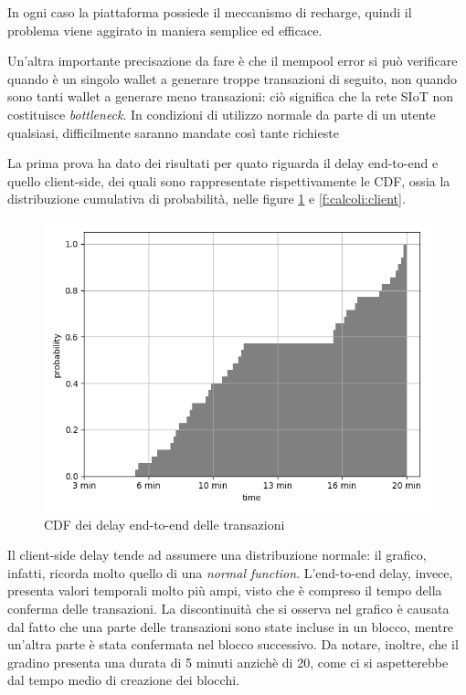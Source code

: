 In ogni caso la piattaforma possiede il meccanismo di recharge, quindi il problema viene aggirato in maniera semplice ed efficace.

Un'altra importante precisazione da fare è che il mempool error si può verificare quando è un singolo wallet a generare troppe transazioni di seguito, non quando sono tanti wallet a generare meno transazioni: ciò significa che la rete SIoT non costituisce \textit{bottleneck}. In condizioni di utilizzo normale da parte di un utente qualsiasi, difficilmente saranno mandate così tante richieste

La prima prova ha dato dei risultati per quato riguarda il delay end-to-end e quello client-side, dei quali sono rappresentate rispettivamente le CDF, ossia la distribuzione cumulativa di probabilità, nelle figure \ref{f:calcoli:end2end} e \ref{f:calcoli:client}. 

\begin{figure}[h!t]
\centerline{\includegraphics[width=\textwidth]{img/end-to-endGIUSTO}}
\caption{CDF dei delay end-to-end delle transazioni}
\label{f:calcoli:end2end}
\end{figure}

Il client-side delay tende ad assumere una distribuzione normale: il grafico, infatti, ricorda molto quello di una \textit{normal function}. 
L'end-to-end delay, invece, presenta valori temporali molto più ampi, visto che è compreso il tempo della conferma delle transazioni. La discontinuità che si osserva nel grafico è causata dal fatto che una parte delle transazioni sono state incluse in un blocco, mentre un'altra parte è stata confermata nel blocco successivo. Da notare, inoltre, che il gradino presenta una durata di 5 minuti anzichè di 20, come ci si aspetterebbe dal tempo medio di creazione dei blocchi.

